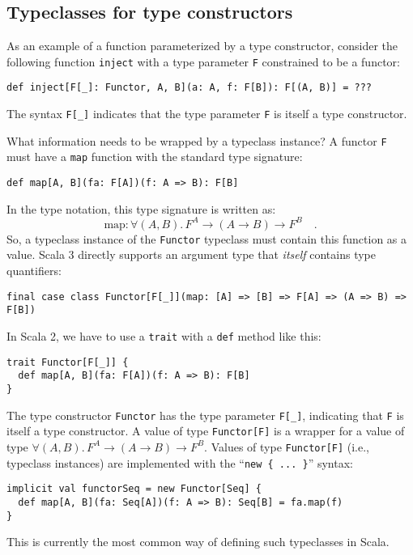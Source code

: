 \subsection{Typeclasses for type constructors\label{subsec:Typeclasses-for-type-constructors}}

As an example of a function parameterized by a type constructor, consider
the following function \lstinline!inject! with a type parameter \lstinline!F!
constrained to be a functor:
\begin{lstlisting}
def inject[F[_]: Functor, A, B](a: A, f: F[B]): F[(A, B)] = ???
\end{lstlisting}
The syntax \lstinline!F[_]! indicates that the type parameter \lstinline!F!
is itself a type constructor. 

What information needs to be wrapped by a typeclass instance? A functor
\lstinline!F! must have a \lstinline!map! function with the standard
type signature:
\begin{lstlisting}
def map[A, B](fa: F[A])(f: A => B): F[B]
\end{lstlisting}
In the type notation, this type signature is written as:
\[
\text{map}:\forall(A,B).\,F^{A}\rightarrow\left(A\rightarrow B\right)\rightarrow F^{B}\quad.
\]
So, a typeclass instance of the \lstinline!Functor! typeclass must
contain this function as a value. Scala 3 directly supports an argument
type that \emph{itself} contains type quantifiers:
\begin{lstlisting}[mathescape=true]
final case class Functor[F[_]](map: [A] => [B] => F[A] => (A => B) => F[B])
\end{lstlisting}
In Scala 2, we have to use a \lstinline!trait! with a \lstinline!def!
method like this:
\begin{lstlisting}
trait Functor[F[_]] {
  def map[A, B](fa: F[A])(f: A => B): F[B]
}
\end{lstlisting}
The type constructor \lstinline!Functor! has the type parameter \lstinline!F[_]!,
indicating that \lstinline!F! is itself a type constructor. A value
of type \lstinline!Functor[F]! is a wrapper for a value of type $\forall(A,B).\,F^{A}\rightarrow\left(A\rightarrow B\right)\rightarrow F^{B}$.
Values of type \lstinline!Functor[F]! (i.e., typeclass instances)
are implemented with the \textsf{``}\lstinline!new { ... }!\textsf{''} syntax:
\begin{lstlisting}
implicit val functorSeq = new Functor[Seq] {
  def map[A, B](fa: Seq[A])(f: A => B): Seq[B] = fa.map(f)
}
\end{lstlisting}
This is currently the most common way of defining such typeclasses
in Scala.

